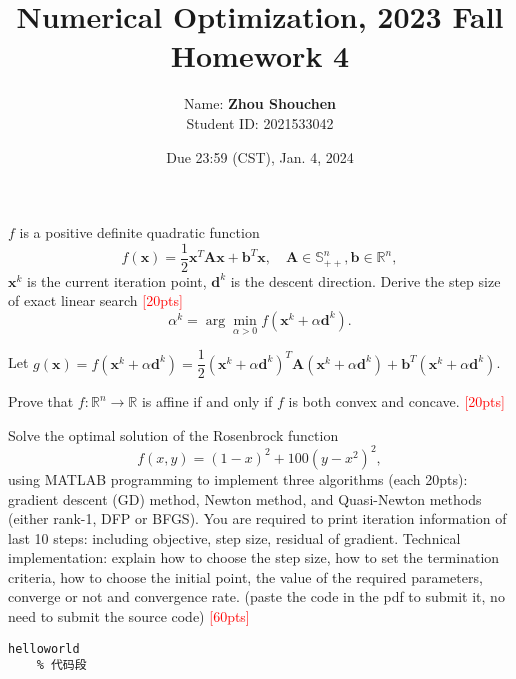 \documentclass[10pt]{article}
\newenvironment{problem}[2][Problem]{\begin{trivlist}
\item[\hskip \labelsep {\bfseries #1}\hskip \labelsep {\bfseries #2.}]}{\end{trivlist}}
\begin{document}
\title{	Numerical Optimization, 2023 Fall\\Homework 4}
\date{Due 23:59 (CST), Jan. 4, 2024 }

\author{
    Name: \textbf{Zhou Shouchen} \\
	Student ID: 2021533042
}

\maketitle
\newpage


\begin{problem}{1}
    $f$ is a positive definite quadratic function $$f(\pmb x) = \frac{1}{2}\pmb x^T\pmb A\pmb x + \pmb b^T\pmb x,  \quad \pmb A \in \mathbb{S}_{++}^n, \pmb b \in \mathbb{R}^n,$$ $\pmb x^k$ is the current iteration point, $\pmb d^k$ is the descent direction. Derive the step size of exact linear search \textcolor{red}{[20pts]} $$\alpha^k = \arg\min_{\alpha > 0}f(\pmb x^k + \alpha \pmb d^k).$$
\end{problem}

Let $g(\pmb x)=f(\pmb x^k+\alpha\pmb d^k)=\dfrac{1}{2}(\pmb x^k+\alpha\pmb d^k)^T\pmb A(\pmb x^k+\alpha\pmb d^k)+\pmb b^T(\pmb x^k+\alpha\pmb d^k)$.



\newpage

\begin{problem}{2}
    Prove that $f: \mathbb{R}^n \rightarrow \mathbb{R}$ is affine if and only if $f$ is both convex and concave. \textcolor{red}{[20pts]} 
\end{problem}



\newpage

\begin{problem}{3}
    Solve the optimal solution of the Rosenbrock function $$f(x, y) = (1 - x)^2 + 100(y - x^2)^2, $$ using MATLAB programming to implement three algorithms (each 20pts): gradient descent (GD) method, Newton method, and Quasi-Newton methods (either rank-1, DFP or BFGS). You are required to print iteration information of last 10 steps: including objective, step size, residual of gradient. Technical implementation: explain how to choose the step size, how to set the termination criteria, how to choose the initial point, the value of the required parameters, converge or not and convergence rate. (paste the code in the pdf to submit it, no need to submit the source code) \textcolor{red}{[60pts]}
\end{problem}

\begin{lstlisting}[title=Myfile, frame=shadowbox]
	helloworld
	% 代码段
\end{lstlisting}
	
\end{document}
